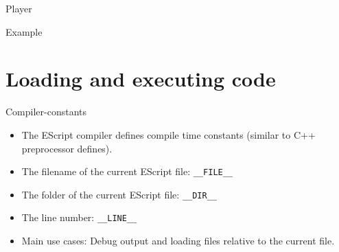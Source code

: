 \documentclass[ucs,9pt]{beamer}
\begin{document}

\begin{frame}{Player}
	\begin{block}{Example}
		
	\end{block}
\end{frame}
%
%
%
%
%
%
%

\section{Loading and executing code}


\begin{frame}[fragile]{Compiler-constants}
\begin{itemize}
\item The EScript compiler defines compile time constants  (similar to C++ preprocessor defines).
\item The filename of the current EScript file: \lstinline!__FILE__!
\item The folder of the current EScript file: \lstinline!__DIR__!
\item The line number: \lstinline!__LINE__!
\item Main use cases: Debug output and loading files relative to the current file.
\end{itemize}
\end{frame}
\end{document}
